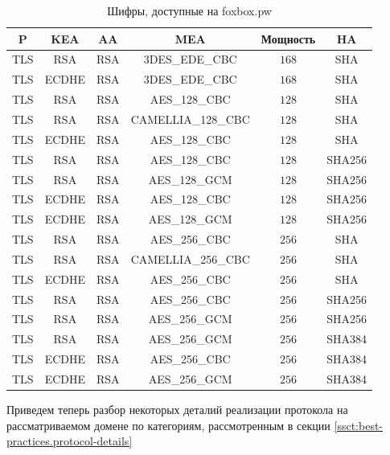 \begin{table}[H]
    \centering
    \begin{tabular}{c|c|c|c|c|c}
        \textbf{P} & \textbf{KEA} & \textbf{AA} & \textbf{MEA} & \textbf{Мощность} & \textbf{HA} \\ 
        \hline
        TLS & RSA & RSA & 3DES\_EDE\_CBC & $168$ & SHA \\
        TLS & ECDHE & RSA & 3DES\_EDE\_CBC & $168$ & SHA \\
        TLS & RSA & RSA & AES\_128\_CBC & $128$ & SHA \\
        TLS & RSA & RSA & CAMELLIA\_128\_CBC & $128$ & SHA \\
        TLS & ECDHE & RSA & AES\_128\_CBC & $128$ & SHA \\
        TLS & RSA & RSA & AES\_128\_CBC & $128$ & SHA256 \\
        TLS & RSA & RSA & AES\_128\_GCM & $128$ & SHA256 \\
        TLS & ECDHE & RSA & AES\_128\_CBC & $128$ & SHA256 \\
        TLS & ECDHE & RSA & AES\_128\_GCM & $128$ & SHA256 \\
        TLS & RSA & RSA & AES\_256\_CBC & $256$ & SHA \\
        TLS & RSA & RSA & CAMELLIA\_256\_CBC & $256$ & SHA \\
        TLS & ECDHE & RSA & AES\_256\_CBC & $256$ & SHA \\
        TLS & RSA & RSA & AES\_256\_CBC & $256$ & SHA256 \\
        TLS & RSA & RSA & AES\_256\_GCM & $256$ & SHA256 \\
        TLS & RSA & RSA & AES\_256\_GCM & $256$ & SHA384 \\
        TLS & ECDHE & RSA & AES\_256\_CBC & $256$ & SHA384 \\
        TLS & ECDHE & RSA & AES\_256\_GCM & $256$ & SHA384 \\
    \end{tabular}
    \caption{Шифры, доступные на foxbox.pw}
    \label{tbl:01-cipher-suits}
\end{table}

Приведем теперь разбор некоторых деталий реализации протокола на рассматриваемом домене по категориям, рассмотренным в секции 
\ref{ssct:best-practices.protocol-details}

